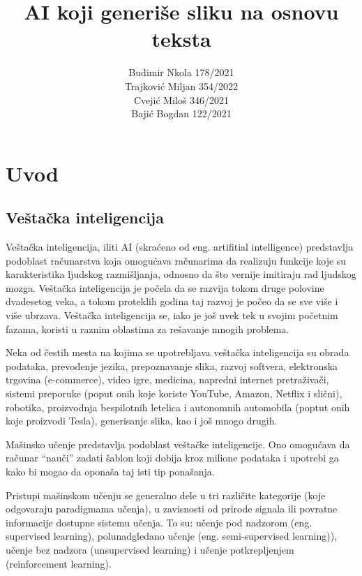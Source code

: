 \documentclass[12pt, letterpaper]{article}
\title{AI koji generiše sliku na osnovu teksta}
\author{Budimir Nkola 178/2021\\Trajković Miljan 354/2022\\Cvejić Miloš 346/2021\\Bajić Bogdan 122/2021}
\begin{document}
\maketitle

\begin{tableofcontents}
\end{tableofcontents}

\pagebreak 

\section{Uvod} 

\subsection*{Veštačka inteligencija} 

Veštačka inteligencija, iliti AI (skraćeno od eng. artifitial intelligence) predstavlja podoblast računarstva koja omogućava računarima da realizuju funkcije koje su karakteristika ljudskog razmišljanja, odnosno da što vernije imitiraju rad ljudskog mozga. Veštačka inteligencija je počela da se razvija tokom druge polovine dvadesetog veka, a tokom proteklih godina taj razvoj je počeo da se sve više i više ubrzava. Veštačka inteligencija se, iako je još uvek tek u svojim početnim fazama, koristi u raznim oblastima za rešavanje mnogih problema. \cite{kljucJedan} 

  

Neka od čestih mesta na kojima se upotrebljava veštačka inteligencija su obrada podataka, prevođenje jezika, prepoznavanje slika, razvoj softvera, elektronska trgovina (e-commerce), video igre, medicina, napredni internet pretraživači, sistemi preporuke (poput onih koje koriste YouTube, Amazon, Netflix i slični), robotika, proizvodnja bespilotnih letelica i autonomnih automobila (poptut onih koje proizvodi Tesla), generisanje slika, kao i još mnogo drugih.  

  

Mašinsko učenje predstavlja podoblast veštačke inteligencije. Ono omogućava da računar “nauči” zadati šablon koji dobija kroz milione podataka i upotrebi ga kako bi mogao da oponaša taj isti tip ponašanja.   

  

Pristupi mašinskom učenju se generalno dele u tri različite kategorije (koje odgovaraju paradigmama učenja), u zavisnosti od prirode signala ili povratne informacije dostupne sistemu učenja. To su: učenje pod nadzorom (eng. supervised learning), polunadgledano učenje (eng. semi-supervised learning)), učenje bez nadzora (unsupervised learning) i učenje potkrepljenjem (reinforcement learning).  
\end{document}
